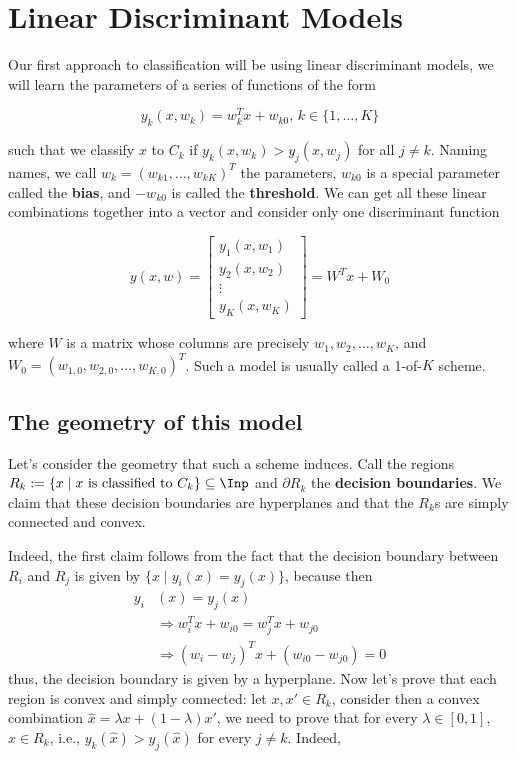 \section{Linear Discriminant Models}

Our first approach to classification will be using linear discriminant models, we will learn the parameters of a series of functions of the form

\[y_k(x,w_k) = w_k^Tx + w_{k0},\, k\in\{1,\dots, K\}\]

such that we classify $x$ to $C_k$ if $y_k(x,w_k) > y_j(x,w_j)$ for all $j\neq k$. Naming names, we call $w_k = (w_{k1},\dots, w_{kK})^T$ the parameters, $w_{k0}$ is a special parameter called the \textbf{bias}, and $-w_{k0}$ is called the \textbf{threshold}. We can get all these linear combinations together into a vector and consider only one discriminant function

\[y(x,w) = \begin{bmatrix}
	y_1(x,w_1)\\
	y_2(x,w_2)\\
	\vdots\\
	y_K(x,w_K)
\end{bmatrix} = W^Tx + W_0\]

where $W$ is a matrix whose columns are precisely $w_1, w_2,\dots, w_K$, and $W_0 = (w_{1,0}, w_{2,0},\dots, w_{K,0})^T$. Such a model is usually called a 1-of-$K$ scheme.

\subsection{The geometry of this model}

Let's consider the geometry that such a scheme induces. Call the regions $R_k := \{x\;|\;x \mbox{ is classified to } C_k\}\subseteq \Inp$ and $\partial R_k$ the \textbf{decision boundaries}. We claim that these decision boundaries are hyperplanes and that the $R_k$s are simply connected and convex.

Indeed, the first claim follows from the fact that the decision boundary between $R_i$ and $R_j$ is given by $\{x\;|\;y_i(x) = y_j(x)\}$, because then
\begin{align*}
y_i&(x) = y_j(x)\\
&\Rightarrow w_i^Tx + w_{i0} = w_j^Tx + w_{j0}\\
&\Rightarrow (w_i - w_j)^Tx + (w_{i0} - w_{j0}) = 0
\end{align*}
thus, the decision boundary is given by a hyperplane. Now let's prove that each region is convex and simply connected: let $x,x'\in R_k$, consider then a convex combination $\hat{x} = \lambda x + (1-\lambda)x'$, we need to prove that for every $\lambda\in [0,1]$, $\hat{x}\in R_k$, i.e., $y_k(\hat{x}) > y_j(\hat{x})$ for every $j\neq k$. Indeed,

